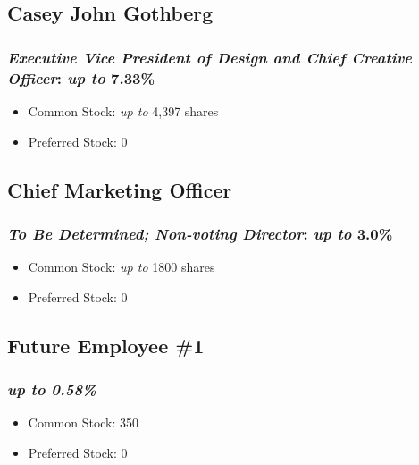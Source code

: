 \documentclass[11pt]{report}
\begin{document}
\subsection{Casey John Gothberg}
\subsubsection{\textit{Executive Vice President of Design and Chief Creative Officer}: \emph{up to} \textbf{7.33\%}}
\begin{itemize}
    \begin{itemize}
    \item 3.00\% awarded 45 days after first day of full time employment (date of hire: Monday, 12 February 2018);
    \item 2.00\% awarded as PBRUs; and
    \item 2.33\% as PCSUs.
    \end{itemize}
\item Common Stock: \emph{up to} 4,397 shares
\item Preferred Stock: 0
\end{itemize}
\subsection{Chief Marketing Officer}
\subsubsection{\textit{To Be Determined; Non-voting Director}: \emph{up to} 3.0\%}
\begin{itemize}
    \begin{itemize}
    \item 1.00\% awarded 45 days after hire;
    \item 1.00\% as PBRUs; and
    \item 1.00\% as PCSUs 
    \end{itemize}
\item Common Stock: \emph{up to} 1800 shares
\item Preferred Stock: 0
\end{itemize}
\subsection{Future Employee \#1}
\subsubsection{\emph{up to 0.58\%}}
\begin{itemize}
\item Common Stock: 350
\item Preferred Stock: 0
\end{itemize}
\end{document}
